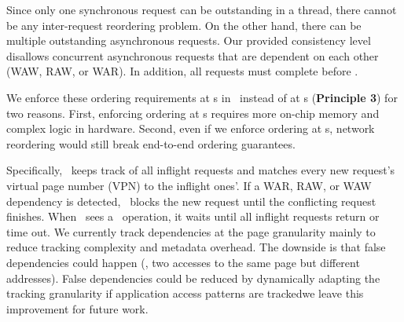 Since only one synchronous request can be outstanding in a thread, there cannot be any inter-request reordering problem.
On the other hand, there can be multiple outstanding asynchronous requests.
Our provided consistency level disallows concurrent asynchronous requests that are dependent on each other (WAW, RAW, or WAR).
In addition, all requests must complete before \release.



We enforce these ordering requirements at \CN{}s in \syslib\ instead of at \MN{}s (\textbf{Principle 3}) for two reasons.
First, enforcing ordering at \MN{}s requires more on-chip memory and complex logic in hardware.
Second, even if we enforce ordering at \MN{}s, network reordering would still break end-to-end ordering guarantees.

Specifically, \syslib\ keeps track of all inflight requests and matches every new request's virtual page number (VPN) to the inflight ones'. 
If a WAR, RAW, or WAW dependency is detected, \syslib\ blocks the new request until the conflicting request finishes.
When \syslib\ sees a \release\ operation, it waits until all inflight requests return or time out.
We currently track dependencies at the page granularity mainly to reduce tracking complexity and metadata overhead. The downside is that false dependencies could happen (\eg, two accesses to the same page but different addresses).
False dependencies could be reduced by dynamically adapting the tracking granularity if application access patterns are tracked\textemdash we leave this improvement for future work.

